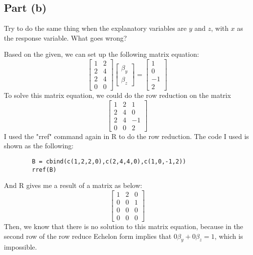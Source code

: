 \subsection{Part (b)}
\begin{question}
    Try to do the same thing when the explanatory variables are $y$ and $z$, with $x$ as the response variable. What goes wrong?
\end{question}

\begin{answer}
    Based on the given, we can set up the following matrix equation:
    \begin{equation}
        \left[\begin{matrix}
            1 & 2\\
            2 & 4\\
            2 & 4\\
            0 & 0
        \end{matrix}\right]
        \left[\begin{matrix}
            \beta_y\\
            \beta_z
        \end{matrix}\right]
        = 
        \left[\begin{matrix}
            1\\
            0\\
            -1\\
            2
        \end{matrix}\right]
    \end{equation}
    To solve this matrix equation, we could do the row reduction on the matrix 
    \begin{equation}
        \left[\begin{matrix}
            1 & 2 & 1\\
            2 & 4 & 0\\
            2 & 4 & -1\\
            0 & 0 & 2
        \end{matrix}\right]
    \end{equation}
    I used the "rref" command again in R to do the row reduction. The code I used is shown as the following:
    \begin{verbatim}
        B = cbind(c(1,2,2,0),c(2,4,4,0),c(1,0,-1,2))
        rref(B)
    \end{verbatim}
    And R gives me a result of a matrix as below:
    \begin{equation}
        \left[\begin{matrix}
            1 & 2 & 0\\
            0 & 0 & 1\\
            0 & 0 & 0\\
            0 & 0 & 0
        \end{matrix}\right]
    \end{equation}
    Then, we know that there is no solution to this matrix equation, because in the second row of the row reduce Echelon form implies that $0\beta_y + 0\beta_z = 1$, which is impossible.
\end{answer}